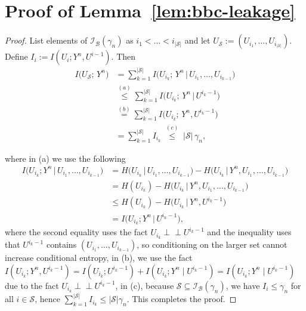 \documentclass[onecolumn]{IEEEtran} %
\newcommand{\1}{\mathbbm{1}}
\theoremstyle{boldremark}
\newcommand{\pperp}{\mathrel{\perp\!\!\!\perp}}
\begin{document}
\section{Proof of Lemma~\ref{lem:bbc-leakage}}\label{APP_proof_lem:bbc-leakage}
\begin{proof}
List elements of $\mathcal{I}_{\mathcal B}(\gamma_n)$ as
\(i_1<\dots<i_{|\mathcal{S}|}\) and let \(U_{\mathcal{S}} := (U_{i_1},\dots,U_{i_{|\mathcal{S}|}})\).
Define \(I_i:=I(U_i;Y^n,U^{i-1})\). Then
\begin{align}
  I\bigl(U_{\mathcal S};\,Y^n\bigr)
  &= \sum_{k=1}^{|\mathcal S|}
     I\bigl(U_{i_k};\,Y^n \,\big|\,U_{i_1},\dots,U_{i_{k-1}}\bigr)\label{eq:chain-mi}\\
  &\overset{(a)}\le \sum_{k=1}^{|\mathcal S|}
     I\bigl(U_{i_k};\,Y^n \,\big|\,U^{i_k-1}\bigr)\label{eq:step-a}\\
  &\overset{(b)}= \sum_{k=1}^{|\mathcal S|}
     I\bigl(U_{i_k};\,Y^n,U^{i_k-1}\bigr)\label{eq:step-b}\\
  &= \sum_{k=1}^{|\mathcal S|} I_{i_k}
  \;\overset{(c)}{\le}\;|\mathcal S|\,\gamma_n,\label{eq:step-c}
\end{align}

where in (a) we use the following
\begin{align*}
I\bigl(U_{i_k};Y^n \,\big|\,U_{i_1},\dots,U_{i_{k-1}}\bigr)
&= H\bigl(U_{i_k}\,\big|\,U_{i_1},\dots,U_{i_{k-1}}\bigr)
   -H\bigl(U_{i_k}\,\big|\,Y^n,U_{i_1},\dots,U_{i_{k-1}}\bigr)\\
&= H(U_{i_k})
   -H\bigl(U_{i_k}\,\big|\,Y^n,U_{i_1},\dots,U_{i_{k-1}}\bigr)\\
&\le H(U_{i_k})
   -H\bigl(U_{i_k}\,\big|\,Y^n,U^{i_k-1}\bigr)\\
&= I\bigl(U_{i_k};Y^n \,\big|\,U^{i_k-1}\bigr),
\end{align*}
where the second equality uses the fact $U_{i_k}\pperp U^{i_k-1}$ and the inequality uses that $U^{i_k-1}$ contains $(U_{i_1},\dots,U_{i_{k-1}})$, so conditioning on the larger set cannot increase conditional entropy, in (b), we use the fact 
$I(U_{i_k};Y^n,U^{i_k-1})=I(U_{i_k};U^{i_k-1})+I(U_{i_k};Y^n\mid U^{i_k-1})
=I(U_{i_k};Y^n\mid U^{i_k-1})$ due to the fact $U_{i_k}\pperp U^{i_k-1}$, in (c), because $\mathcal S\subseteq\mathcal I_{\mathcal B}(\gamma_n)$, we have $I_i\le \gamma_n$ for all
$i\in\mathcal S$, hence $\sum_{k=1}^{|\mathcal S|} I_{i_k}\le |\mathcal S|\gamma_n$.
This completes the proof.
\end{proof}
\end{document}
